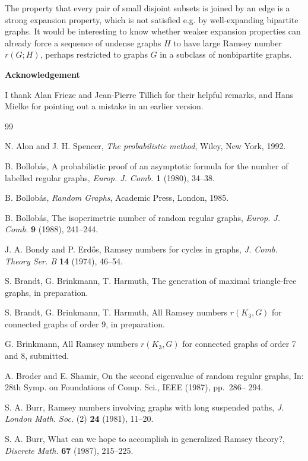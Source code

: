 \documentclass[12pt,a4paper]{article}
\begin{document}
The property that every pair of small disjoint subsets is joined by an edge is
a strong expansion property, which is not satisfied e.g. by well-expanding bipartite
graphs. It would be interesting to know whether weaker expansion properties can
already force a sequence of undense graphs $H$ to have large Ramsey number $r(G;H)$,
perhaps restricted to graphs $G$ in a subclass of nonbipartite graphs.

\medskip
\noindent\textbf{Acknowledgement}

I thank Alan Frieze and Jean-Pierre Tillich for their helpful remarks, and Hans
Mielke for pointing out a mistake in an earlier version.

\begin{thebibliography}{99}

N. Alon and J. H. Spencer, \emph{The probabilistic method}, Wiley, New York,
1992.

B. Bollob\'as, A probabilistic proof of an asymptotic formula for the number
of labelled regular graphs, \emph{Europ. J. Comb.} \textbf{1} (1980), 34--38.

B. Bollob\'as, \emph{Random Graphs}, Academic Press, London, 1985.

B. Bollob\'as, The isoperimetric number of random regular graphs, \emph{Europ. J.}
\emph{Comb.} \textbf{9} (1988), 241--244.

J. A. Bondy and P. Erd\H{o}s, Ramsey numbers for cycles in graphs, \emph{J. Comb.}
\emph{Theory Ser. B} \textbf{14} (1974), 46--54.

S. Brandt, G. Brinkmann, T. Harmuth, The generation of maximal
triangle-free graphs, in preparation.

S. Brandt, G. Brinkmann, T. Harmuth, All Ramsey numbers $r(K_3,G)$
for connected graphs of order 9, in preparation.

G. Brinkmann, All Ramsey numbers $r(K_3,G)$ for connected graphs of order
7 and 8, submitted.

A. Broder and E. Shamir, On the second eigenvalue of random regular
graphs, In: 28th Symp. on Foundations of Comp. Sci., IEEE (1987), pp.~286--
294.

S. A. Burr, Ramsey numbers involving graphs with long suspended paths, \emph{J.}
\emph{London Math. Soc.} (2) \textbf{24} (1981), 11--20.

S. A. Burr, What can we hope to accomplish in generalized Ramsey theory?,
\emph{Discrete Math.} \textbf{67} (1987), 215--225.


\end{thebibliography}
\end{document}

